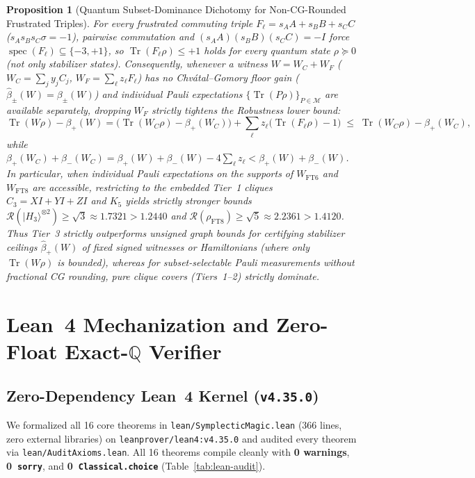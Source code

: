 \documentclass[11pt,a4paper]{article}
\newtheorem{proposition}[theorem]{Proposition}
\theoremstyle{definition}
\theoremstyle{remark}
\newcommand{\Q}{\mathbb{Q}}
\newcommand{\RoM}{\mathcal{R}}
\newcommand{\Tr}{\operatorname{Tr}}
\newcommand{\Code}[1]{{\small\texttt{#1}}}
\begin{document}
\begin{proposition}[Quantum Subset-Dominance Dichotomy for Non-CG-Rounded Frustrated Triples]
\label{prop:subset-dominance}
For every frustrated commuting triple $F_\ell = s_A A + s_B B + s_C C$ ($s_A s_B s_C \sigma = -1$), pairwise commutation and $(s_A A)(s_B B)(s_C C) = -I$ force $\operatorname{spec}(F_\ell) \subseteq \{-3, +1\}$, so $\Tr(F_\ell \rho) \le +1$ holds for \emph{every} quantum state $\rho \succeq 0$ (not only stabilizer states). Consequently, whenever a witness $W = W_C + W_F$ ($W_C = \sum_j y_j C_j$, $W_F = \sum_\ell z_\ell F_\ell$) has no Chv\'atal--Gomory floor gain ($\hat{\beta}_\pm(W) = \beta_\pm(W)$) and individual Pauli expectations $\{\Tr(P\rho)\}_{P \in \mathcal{M}}$ are available separately, dropping $W_F$ strictly tightens the Robustness lower bound:
\[
  \Tr(W\rho) - \beta_+(W) = \bigl(\Tr(W_C\rho) - \beta_+(W_C)\bigr) + \sum_\ell z_\ell\bigl(\Tr(F_\ell\rho) - 1\bigr) \;\le\; \Tr(W_C\rho) - \beta_+(W_C),
\]
while $\beta_+(W_C) + \beta_-(W_C) = \beta_+(W) + \beta_-(W) - 4\sum_\ell z_\ell < \beta_+(W) + \beta_-(W)$. In particular, when individual Pauli expectations on the supports of $W_{\mathrm{FT6}}$ and $W_{\mathrm{FT8}}$ are accessible, restricting to the embedded Tier~1 cliques $C_3 = XI+YI+ZI$ and $K_5$ yields strictly stronger bounds $\RoM(|H_3\rangle^{\otimes 2}) \ge \sqrt{3} \approx 1.7321 > 1.2440$ and $\RoM(\rho_{\mathrm{FT8}}) \ge \sqrt{5} \approx 2.2361 > 1.4120$. Thus Tier~3 strictly outperforms unsigned graph bounds for certifying stabilizer ceilings $\hat{\beta}_+(W)$ of \emph{fixed signed witnesses or Hamiltonians} (where only $\Tr(W\rho)$ is bounded), whereas for \emph{subset-selectable} Pauli measurements without fractional CG rounding, pure clique covers (Tiers~1--2) strictly dominate.
\end{proposition}

\section{Lean~4 Mechanization and Zero-Float Exact-\texorpdfstring{$\Q$}{Q} Verifier}
\label{sec:verification}

\subsection{Zero-Dependency Lean~4 Kernel (\texorpdfstring{\Code{v4.35.0}}{v4.35.0})}
We formalized all 16 core theorems in \Code{lean/SymplecticMagic.lean} (366 lines, zero external libraries) on \Code{leanprover/lean4:v4.35.0} \cite{deMoura2021Lean4} and audited every theorem via \Code{lean/AuditAxioms.lean}. All 16 theorems compile cleanly with \textbf{0 warnings}, \textbf{0~\Code{sorry}}, and \textbf{0~\Code{Classical.choice}} (Table~\ref{tab:lean-audit}).
\end{document}
